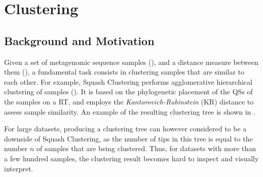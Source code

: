 
\chapter{Clustering}
\label{ch:Clustering}




\section{Background and Motivation}
\label{ch:Clustering:sec:Motivation}

Given a set of metagenomic sequence samples (),
and a distance measure between them (),
a fundamental task consists in clustering samples that are similar to each other.
For example, Squash Clustering performs agglomerative hierarchical clustering of samples
().
It is based on the phylogenetic placement of the \acfp{QS} of the samples on a \acf{RT},
and employs the \emph{Kantorovich-Rubinstein} (KR) distance \cite{Matsen2011a,Evans2012} to assess sample similarity.
An example of the resulting clustering tree is shown in .

For large datasets, producing a clustering tree can however considered to be a downside of Squash Clustering,
as the number of tips in this tree is equal to the number $n$ of samples that are being clustered.
Thus, for datasets with more than a few hundred samples,
the clustering result becomes hard to inspect and visually interpret.

